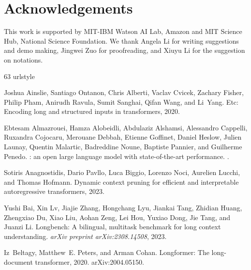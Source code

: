 \documentclass{article} \usepackage{iclr2024_conference,times}
\begin{document}
\section*{Acknowledgements}
This work is supported by 
MIT-IBM Watson AI Lab,  
Amazon and MIT Science Hub,   
National Science Foundation.
We thank Angela Li for writing suggestions and demo making, Jingwei Zuo for proofreading, and Xiuyu Li for the suggestion on notations.
\begin{thebibliography}{63}
\providecommand{\natexlab}[1]{#1}
\providecommand{\url}[1]{\texttt{#1}}
\expandafter\ifx\csname urlstyle\endcsname\relax
  \providecommand{\doi}[1]{doi: #1}\else
  \providecommand{\doi}{doi: \begingroup \urlstyle{rm}\Url}\fi

Joshua Ainslie, Santiago Ontanon, Chris Alberti, Vaclav Cvicek, Zachary Fisher,
  Philip Pham, Anirudh Ravula, Sumit Sanghai, Qifan Wang, and Li~Yang.
\newblock Etc: Encoding long and structured inputs in transformers, 2020.

Ebtesam Almazrouei, Hamza Alobeidli, Abdulaziz Alshamsi, Alessandro Cappelli,
  Ruxandra Cojocaru, Merouane Debbah, Etienne Goffinet, Daniel Heslow, Julien
  Launay, Quentin Malartic, Badreddine Noune, Baptiste Pannier, and Guilherme
  Penedo.
: an open large language model with state-of-the-art
  performance.
.

Sotiris Anagnostidis, Dario Pavllo, Luca Biggio, Lorenzo Noci, Aurelien Lucchi,
  and Thomas Hofmann.
\newblock Dynamic context pruning for efficient and interpretable
  autoregressive transformers, 2023.

Yushi Bai, Xin Lv, Jiajie Zhang, Hongchang Lyu, Jiankai Tang, Zhidian Huang,
  Zhengxiao Du, Xiao Liu, Aohan Zeng, Lei Hou, Yuxiao Dong, Jie Tang, and
  Juanzi Li.
\newblock Longbench: A bilingual, multitask benchmark for long context
  understanding.
\newblock \emph{arXiv preprint arXiv:2308.14508}, 2023.

Iz~Beltagy, Matthew~E. Peters, and Arman Cohan.
\newblock Longformer: The long-document transformer, 2020.
\newblock arXiv:2004.05150.


\end{thebibliography}
\end{document}

